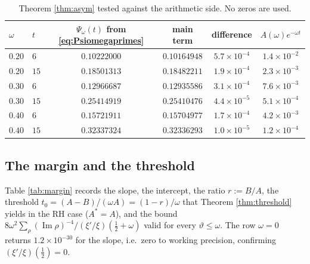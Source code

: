 \documentclass[11pt,reqno]{amsart}
\theoremstyle{plain}
\theoremstyle{definition}
\newcommand{\Ip}{\operatorname{Im}}
\begin{document}
\begin{table}[htbp]
\centering
\begin{tabular}{@{}llcccc@{}}
\toprule
$\omega$ & $t$ & $\Psi_\omega(t)$ from \eqref{eq:Psiomegaprimes} & main term & difference & $A(\omega)e^{-\omega t}$\\
\midrule
$0.20$ & $6$  & $0.10222000$ & $0.10164948$ & $5.7\times10^{-4}$ & $1.4\times10^{-2}$\\
$0.20$ & $15$ & $0.18501313$ & $0.18482211$ & $1.9\times10^{-4}$ & $2.3\times10^{-3}$\\
$0.30$ & $6$  & $0.12966687$ & $0.12935586$ & $3.1\times10^{-4}$ & $7.6\times10^{-3}$\\
$0.30$ & $15$ & $0.25414919$ & $0.25410476$ & $4.4\times10^{-5}$ & $5.1\times10^{-4}$\\
$0.40$ & $6$  & $0.15721911$ & $0.15704977$ & $1.7\times10^{-4}$ & $4.2\times10^{-3}$\\
$0.40$ & $15$ & $0.32337324$ & $0.32336293$ & $1.0\times10^{-5}$ & $1.2\times10^{-4}$\\
\bottomrule
\end{tabular}
\vspace{2mm}
\caption{Theorem \ref{thm:asym} tested against the arithmetic side. No zeros are used.}
\label{tab:asym}
\end{table}

\subsection{The margin and the threshold}
Table \ref{tab:margin} records the slope, the intercept, the ratio $r:=B/A$, the threshold
$t_0=(A-B)/(\omega A)=(1-r)/\omega$ that Theorem \ref{thm:threshold} yields in the RH case
($A^{*}=A$), and the bound $8\omega^{2}\sum_\rho(\Ip\rho)^{-4}/(\xi'/\xi)(\tfrac12+\omega)$ valid
for every $\vartheta\le\omega$. The row $\omega=0$ returns $1.2\times10^{-30}$ for the slope, i.e.\
zero to working precision, confirming $(\xi'/\xi)(\tfrac12)=0$.
\end{document}
